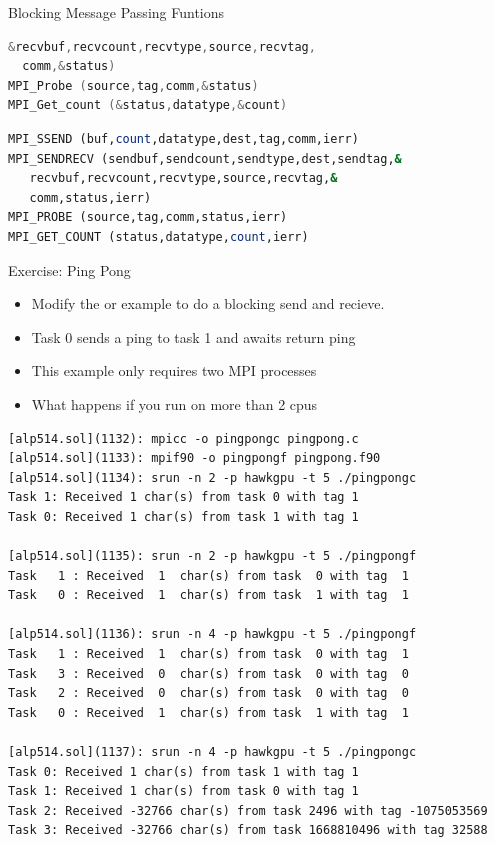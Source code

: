 \documentclass[9pt,c]{beamer}
\begin{document}
\begin{frame}{Blocking Message Passing Funtions}
\begin{block}{}
\begin{lstlisting}[basicstyle=\scriptsize\ttfamily,language=C]
  &recvbuf,recvcount,recvtype,source,recvtag,
  comm,&status)
MPI_Probe (source,tag,comm,&status)
MPI_Get_count (&status,datatype,&count)
  \end{lstlisting}
  \end{block}
  \vspace{-0.25cm}
  \begin{block}{}
  \begin{lstlisting}[basicstyle=\scriptsize\selectfont\ttfamily,language=Fortran]
MPI_SSEND (buf,count,datatype,dest,tag,comm,ierr)
MPI_SENDRECV (sendbuf,sendcount,sendtype,dest,sendtag,&
   recvbuf,recvcount,recvtype,source,recvtag,&
   comm,status,ierr)
MPI_PROBE (source,tag,comm,status,ierr)
MPI_GET_COUNT (status,datatype,count,ierr)
  \end{lstlisting}
  \end{block}
\end{frame}

\begin{frame}{Exercise: Ping Pong}
  \begin{itemize}
    \item Modify the  or  example to do a blocking send and recieve.
    \item Task 0 sends a ping to task 1 and awaits return ping
    \item This example only requires two MPI processes
    \item What happens if you run on more than 2 cpus
  \end{itemize}
  \framebreak
  \begin{exampleblock}{}
    \begin{lstlisting}[basicstyle=\scriptsize\ttfamily]
[alp514.sol](1132): mpicc -o pingpongc pingpong.c
[alp514.sol](1133): mpif90 -o pingpongf pingpong.f90
[alp514.sol](1134): srun -n 2 -p hawkgpu -t 5 ./pingpongc
Task 1: Received 1 char(s) from task 0 with tag 1
Task 0: Received 1 char(s) from task 1 with tag 1

[alp514.sol](1135): srun -n 2 -p hawkgpu -t 5 ./pingpongf
Task   1 : Received  1  char(s) from task  0 with tag  1
Task   0 : Received  1  char(s) from task  1 with tag  1

[alp514.sol](1136): srun -n 4 -p hawkgpu -t 5 ./pingpongf
Task   1 : Received  1  char(s) from task  0 with tag  1
Task   3 : Received  0  char(s) from task  0 with tag  0
Task   2 : Received  0  char(s) from task  0 with tag  0
Task   0 : Received  1  char(s) from task  1 with tag  1

[alp514.sol](1137): srun -n 4 -p hawkgpu -t 5 ./pingpongc
Task 0: Received 1 char(s) from task 1 with tag 1
Task 1: Received 1 char(s) from task 0 with tag 1
Task 2: Received -32766 char(s) from task 2496 with tag -1075053569
Task 3: Received -32766 char(s) from task 1668810496 with tag 32588
    \end{lstlisting}
  \end{exampleblock}
\end{frame}
\end{document}
